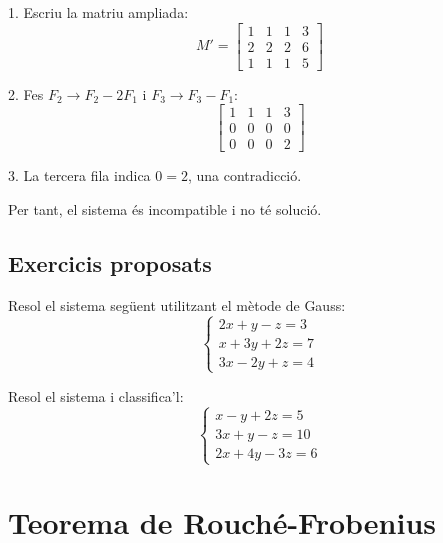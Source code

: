 \documentclass[12pt]{article}
\begin{document}
\begin{exemple}
1. Escriu la matriu ampliada:
\[
M' =
\begin{bmatrix}
1 & 1 & 1 & 3 \\
2 & 2 & 2 & 6 \\
1 & 1 & 1 & 5
\end{bmatrix}
\]

2. Fes \(F_2 \to F_2 - 2F_1\) i \(F_3 \to F_3 - F_1\):
\[
\begin{bmatrix}
1 & 1 & 1 & 3 \\
0 & 0 & 0 & 0 \\
0 & 0 & 0 & 2
\end{bmatrix}
\]

3. La tercera fila indica \(0 = 2\), una contradicció.

Per tant, el sistema és incompatible i no té solució.
\end{exemple}


\subsection*{Exercicis proposats}
\begin{exercici}
Resol el sistema següent utilitzant el mètode de Gauss:
\[
\begin{cases}
2x + y - z = 3 \\
x + 3y + 2z = 7 \\
3x - 2y + z = 4
\end{cases}
\]
\end{exercici}

\begin{exercici}
Resol el sistema i classifica'l:
\[
\begin{cases}
x - y + 2z = 5 \\
3x + y - z = 10 \\
2x + 4y - 3z = 6
\end{cases}
\]
\end{exercici}

\newpage

\section{Teorema de Rouché-Frobenius}
\end{document}

